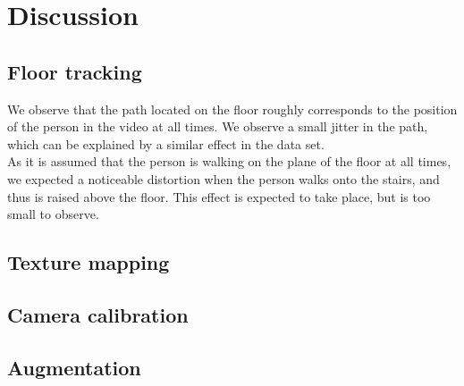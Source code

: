\section{Discussion}
	\subsection{Floor tracking}
	We observe that the path located on the floor roughly corresponds to the position of the person in the video at all times. We observe a small jitter in the path, which can be explained by a similar effect in the data set.\\
	As it is assumed that the person is walking on the plane of the floor at all times, we expected a noticeable distortion when the person walks onto the stairs, and thus is raised above the floor. This effect is expected to take place, but is too small to observe. 
	\subsection{Texture mapping}
	\subsection{Camera calibration}
	\subsection{Augmentation}
